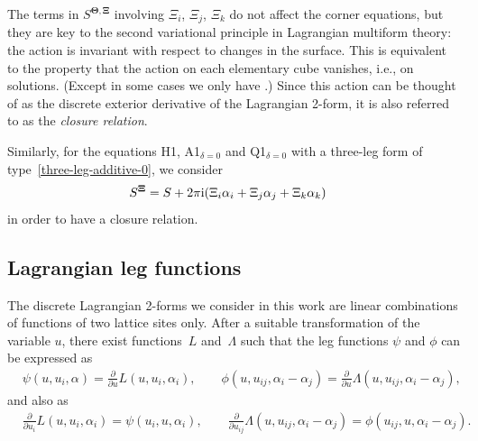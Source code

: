 \documentclass[10pt,a4paper]{amsart}
\newcommand{\pdv}[2]{\frac{\partial {#1}}{\partial {#2}}}
\renewcommand{\vec}{\boldsymbol}
\numberwithin{equation}{section}
\begin{document}
The terms in $S^{\vec \Theta,\vec \Xi}$ involving $\Xi_i$, $\Xi_j$, $\Xi_k$ do not affect the corner equations, but they are key to the second variational principle in Lagrangian multiform theory: the action is invariant with respect to changes in the surface. This is equivalent to the property that the action on each elementary cube vanishes, i.e., \smash{$S^{\vec \Theta,\vec \Xi} = 0$} on solutions. \big(Except in some cases we only have \smash{$S^{\vec \Theta,\vec \Xi} \equiv 0 \mod 4 \pi^2$}.\big) Since this action can be thought of as the discrete exterior derivative of the Lagrangian 2-form, it is also referred to as the \emph{closure relation}.

Similarly, for the equations H1, A1$_{\delta=0}$ and Q1$_{\delta=0}$ with a three-leg form of type~\eqref{three-leg-additive-0}, we consider
\begin{align*}
 S^{\vec \Xi} &= S + 2 \pi {\rm i} (\Xi_i \alpha_i + \Xi_j \alpha_j + \Xi_k \alpha_k)
\end{align*}
in order to have a closure relation.

\subsection{Lagrangian leg functions}

The discrete Lagrangian 2-forms we consider in this work are linear combinations of functions of two lattice sites only.
After a suitable transformation of the variable $u$, there exist functions~$L$ and~$\Lambda$ such that the leg functions $\psi$ and $\phi$ can be expressed as
\begin{align*}
	&\psi(u,u_i, \alpha)= \pdv{}{u} L(u,u_i,\alpha_i) , \qquad
	\phi(u,u_{ij}, \alpha_i - \alpha_j)= \pdv{}{u} \Lambda(u,u_{ij},\alpha_i-\alpha_j) ,
\end{align*}
and also as
\begin{align*}
	&\pdv{}{u_i} L(u,u_i,\alpha_i)= \psi(u_i,u,\alpha_i) , \qquad
	\pdv{}{u_{ij}} \Lambda(u,u_{ij},\alpha_i-\alpha_j)= \phi(u_{ij},u, \alpha_i-\alpha_j) .
\end{align*}
\end{document}
